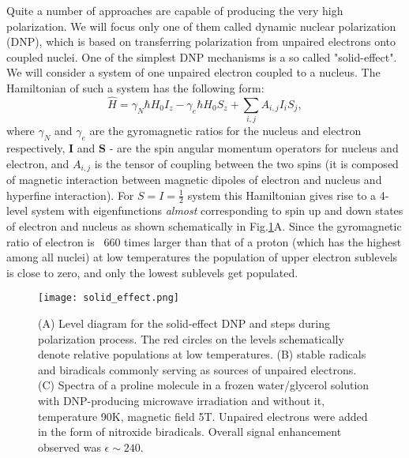 \documentclass[a4paper, 12pt]{article}
\begin{document}
  Quite a number of approaches are capable of producing the very high polarization. We will focus only one of them called dynamic nuclear polarization (DNP), which is based on transferring polarization from unpaired electrons onto coupled nuclei. One of the simplest DNP mechanisms is a so called "solid-effect". We will consider a system of one unpaired electron coupled to a nucleus. The Hamiltonian of such a system has the following form:
  \begin{equation}
  \hat H = \gamma_N \hbar H_0 I_z - \gamma_e \hbar H_0 S_z + \sum_{i,j}A_{i,j}I_i S_j,
  \end{equation}
where $\gamma_N$ and $\gamma_e$ are the gyromagnetic ratios for the nucleus and electron respectively, $\bm{I}$ and $\bm{S}$ - are the spin angular momentum operators for nucleus and electron, and $A_{i,j}$ is the tensor of coupling between the two spins (it is composed of magnetic interaction between magnetic dipoles of electron and nucleus and hyperfine interaction). For $S=I=\frac{1}{2}$ system this Hamiltonian gives rise to a 4-level system with eigenfunctions \textit{almost} corresponding to spin up and down states of electron and nucleus as shown schematically in Fig.\ref{fig:solid_effect}A. Since the gyromagnetic ratio of electron is ~660 times larger than that of a proton (which has the highest among all nuclei) at low temperatures the population of upper electron sublevels is close to zero, and only the lowest sublevels get populated.

\begin{figure}[ht]
\caption{(A) Level diagram for the solid-effect DNP and steps during polarization process. The red circles on the levels schematically denote relative populations at low temperatures. (B) stable radicals and biradicals commonly serving as sources of unpaired electrons. (C) Spectra of a proline molecule in a frozen water/glycerol solution with DNP-producing microwave irradiation and without it, temperature 90K, magnetic field 5T. Unpaired electrons were added in the form of nitroxide biradicals. Overall signal enhancement observed was $\epsilon \sim 240$.}
\label{fig:solid_effect}
\centering
\texttt{[image: solid\_effect.png]}
\end{figure}
  
\end{document}
